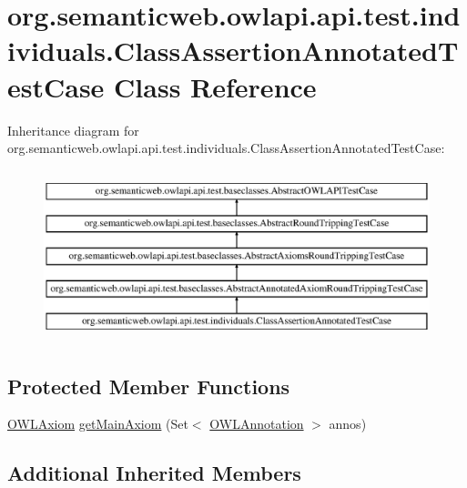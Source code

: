 \hypertarget{classorg_1_1semanticweb_1_1owlapi_1_1api_1_1test_1_1individuals_1_1_class_assertion_annotated_test_case}{\section{org.\-semanticweb.\-owlapi.\-api.\-test.\-individuals.\-Class\-Assertion\-Annotated\-Test\-Case Class Reference}
\label{classorg_1_1semanticweb_1_1owlapi_1_1api_1_1test_1_1individuals_1_1_class_assertion_annotated_test_case}
}
Inheritance diagram for org.\-semanticweb.\-owlapi.\-api.\-test.\-individuals.\-Class\-Assertion\-Annotated\-Test\-Case\-:\begin{figure}[H]
\begin{center}
\leavevmode
\includegraphics[height=5.000000cm]{classorg_1_1semanticweb_1_1owlapi_1_1api_1_1test_1_1individuals_1_1_class_assertion_annotated_test_case}
\end{center}
\end{figure}
\subsection*{Protected Member Functions}
\begin{DoxyCompactItemize}
\item 
\hyperlink{interfaceorg_1_1semanticweb_1_1owlapi_1_1model_1_1_o_w_l_axiom}{O\-W\-L\-Axiom} \hyperlink{classorg_1_1semanticweb_1_1owlapi_1_1api_1_1test_1_1individuals_1_1_class_assertion_annotated_test_case_a02e2ae5ea8cb94f4459e7f4221c6a2b8}{get\-Main\-Axiom} (Set$<$ \hyperlink{interfaceorg_1_1semanticweb_1_1owlapi_1_1model_1_1_o_w_l_annotation}{O\-W\-L\-Annotation} $>$ annos)
\end{DoxyCompactItemize}
\subsection*{Additional Inherited Members}


